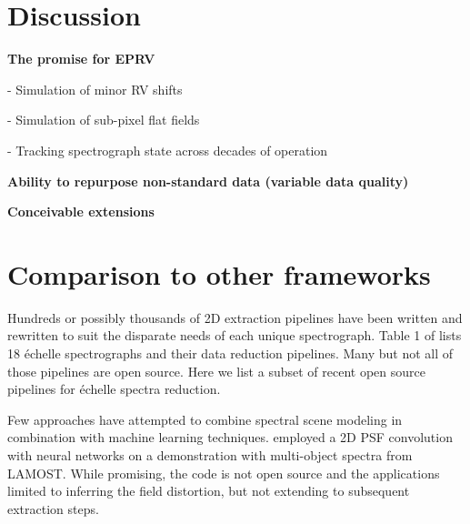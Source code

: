 \documentclass[twocolumn]{aastex63}
\begin{document}
\section{Discussion}
\begin{mdframed}
  \textbf{The promise for EPRV} \par
  - Simulation of minor RV shifts\par
  - Simulation of sub-pixel flat fields \par
  - Tracking spectrograph state across decades of operation\par
  \textcolor{lightgray}{\lipsum[14]}
\end{mdframed}


\begin{mdframed}
  \textbf{Ability to repurpose non-standard data (variable data quality)} \par
  \textcolor{lightgray}{\lipsum[15]}
\end{mdframed}


\begin{mdframed}
  \textbf{Conceivable extensions} \par
  \textcolor{lightgray}{\lipsum[16]}
\end{mdframed}



\acknowledgements




\appendix

\section{Comparison to other frameworks}

Hundreds or possibly thousands of 2D extraction pipelines have been written and rewritten to suit the disparate needs of each unique spectrograph.  Table 1 of \citet{2022PASP..134k4509C} lists 18 \'echelle spectrographs and their data reduction pipelines.  Many but not all of those pipelines are open source.  Here we list a subset of recent open source pipelines for \'echelle spectra reduction.

Few approaches have attempted to combine spectral scene modeling in combination with machine learning techniques.  \citet{2020MNRAS.499.1972X} employed a 2D PSF convolution with neural networks on a demonstration with multi-object spectra from LAMOST.  While promising, the code is not open source and the applications limited to inferring the field distortion, but not extending to subsequent extraction steps.
\end{document}
